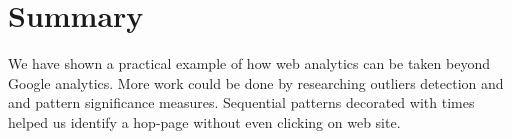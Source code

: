 \documentclass[12pt, english,a4paper]{article}
\begin{document}
\section{Summary}
We have shown a practical example of how web analytics can be taken beyond Google analytics.
More work could be done by researching outliers detection and and pattern significance measures.
Sequential patterns decorated with times helped us identify a hop-page without even clicking on web site.











\end{document}
